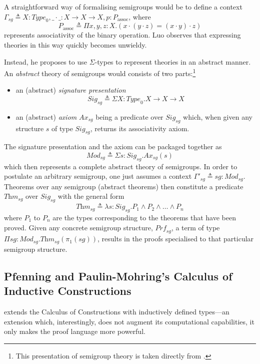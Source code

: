 \documentclass[12pt,toc=bibliography,numbers=noendperiod,
               footnotes=multiple,twoside]{scrartcl}
\begin{document}
A straightforward way of formalising semigroups would be to define a context \(\Gamma_{sg} \triangleq X : \textit{Type}_0, \_\cdot\_ : X \rightarrow X \rightarrow X, p : P_\textrm{assoc}\), where \[P_\textrm{assoc} \triangleq \Pi x,y,z:X.(x \cdot (y \cdot z) = (x \cdot y) \cdot z)\] represents associativity of the binary operation. Luo observes that expressing theories in this way quickly becomes unwieldy.

Instead, he proposes to use \(\Sigma\)-types to represent theories in an abstract manner. An \emph{abstract} theory of semigroups would consists of two parts:\footnote{This presentation of semigroup theory is taken directly from \textcite[100]{luo_extended_1990}.}

\begin{itemize}
\item an (abstract) \emph{signature presentation} \[\textit{Sig}_{sg} \triangleq \Sigma X : \textit{Type}_0. X \rightarrow X \rightarrow X\]
\item an (abstract) \emph{axiom} \(\textit{Ax}_{sg}\) being a predicate over \(\textit{Sig}_{sg}\) which, when given any structure \(s\) of type \(\textit{Sig}_{sg}\), returns its associativity axiom.
\end{itemize}

The signature presentation and the axiom can be packaged together as \[\textit{Mod}_{sg} \triangleq \Sigma s : \textit{Sig}_{sg}. \textit{Ax}_{sg}(s)\] which then represents a complete abstract theory of semigroups. In order to postulate an arbitrary semigroup, one just assumes a context \(\Gamma'_{sg} \triangleq sg : \textit{Mod}_{sg}\). Theorems over any semigroup (abstract theorems) then constitute a predicate \(\textit{Thm}_{sg}\) over \(\textit{Sig}_{sg}\) with the general form \[\textit{Thm}_{sg} \triangleq \lambda s : \textit{Sig}_{sg}. P_1 \wedge P_2 \wedge \dots \wedge P_n\] where \(P_1\) to \(P_n\) are the types corresponding to the theorems that have been proved. Given any concrete semigroup structure, \(\textit{Prf}_{sg}\), a term of type \(\Pi sg : \textit{Mod}_{sg}. \textit{Thm}_{sg}(\pi_1(sg))\), results in the proofs specialised to that particular semigroup structure.

\subsection{Pfenning and Paulin-Mohring's Calculus of Inductive Constructions}

\textcite{pfenning_inductively_1990} extends the Calculus of Constructions with inductively defined types---an extension which, interestingly, does not augment its computational capabilities, it only makes the proof language more powerful.
\end{document}
